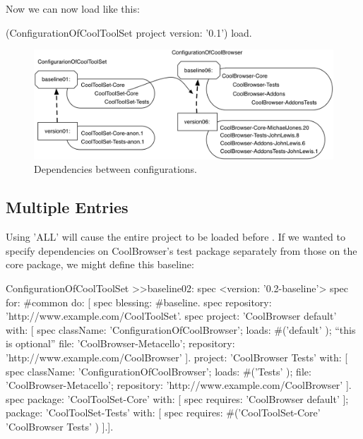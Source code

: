 \documentclass[a4paper,10pt,twoside]{book}
\begin{document}
Now we can now load  like this:

\begin{code}{}
(ConfigurationOfCoolToolSet project version: '0.1') load.
\end{code}

                

\begin{figure}
\begin{center}
\includegraphics[width=0.9\linewidth]{version07}
\caption{Dependencies between configurations.\label{fig:version07}}
\end{center}
\end{figure} 



\subsection{Multiple Entries}

Using 'ALL' will cause the entire  project to be loaded before . 
If we wanted to specify dependencies on CoolBrowser's test package separately from those on the core package, we might define this baseline:

\begin{code}{}
ConfigurationOfCoolToolSet >>baseline02: spec 
       <version: '0.2-baseline'>
       spec for: #common do: [
              spec blessing: #baseline.
              spec repository: 'http://www.example.com/CoolToolSet'.
              spec project: 'CoolBrowser default' with: [
                            spec
                                   className: 'ConfigurationOfCoolBrowser';
                                   loads: #('default' );  ``this is optional''
                                   file: 'CoolBrowser-Metacello';
                                   repository: 'http://www.example.com/CoolBrowser' ].
                     project: 'CoolBrowser Tests' with: [
                            spec
                                   className: 'ConfigurationOfCoolBrowser';
                                   loads: #('Tests' );
                                   file: 'CoolBrowser-Metacello';
                                   repository: 'http://www.example.com/CoolBrowser' ].
              spec 
                     package: 'CoolToolSet-Core' with: [ spec requires: 'CoolBrowser default' ];
                     package: 'CoolToolSet-Tests' with: [ 
                            spec requires: #('CoolToolSet-Core'  'CoolBrowser Tests'  ) ].].                     
\end{code}
\end{document}
